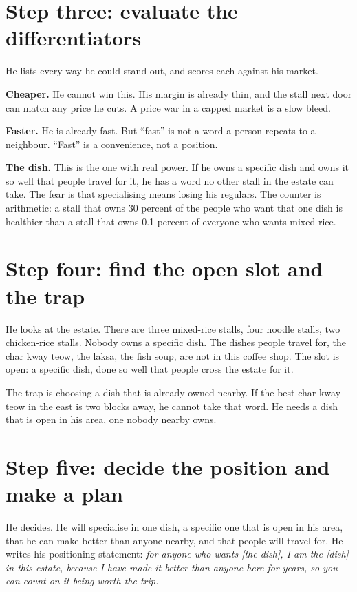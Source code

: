 \documentclass[10pt,twoside,openany]{memoir}
\newcommand{\needspacehead}{\needspace{4\baselineskip}}
\let\oldsection\section
\renewcommand{\section}{\needspacehead\oldsection}
\begin{document}
{\section{Step three: evaluate the
differentiators}\label{step-three-evaluate-the-differentiators}

He lists every way he could stand out, and scores each against his
market.

\textbf{Cheaper.} He cannot win this. His margin is already thin, and
the stall next door can match any price he cuts. A price war in a capped
market is a slow bleed.

\textbf{Faster.} He is already fast. But ``fast'' is not a word a person
repeats to a neighbour. ``Fast'' is a convenience, not a position.

\textbf{The dish.} This is the one with real power. If he owns a
specific dish and owns it so well that people travel for it, he has a
word no other stall in the estate can take. The fear is that
specialising means losing his regulars. The counter is arithmetic: a
stall that owns 30 percent of the people who want that one dish is
healthier than a stall that owns 0.1 percent of everyone who wants mixed
rice.

\section{Step four: find the open slot and the
trap}\label{step-four-find-the-open-slot-and-the-trap}

He looks at the estate. There are three mixed-rice stalls, four noodle
stalls, two chicken-rice stalls. Nobody owns a specific dish. The dishes
people travel for, the char kway teow, the laksa, the fish soup, are not
in this coffee shop. The slot is open: a specific dish, done so well
that people cross the estate for it.

The trap is choosing a dish that is already owned nearby. If the best
char kway teow in the east is two blocks away, he cannot take that word.
He needs a dish that is open in his area, one nobody nearby owns.

\section{Step five: decide the position and make a
plan}\label{step-five-decide-the-position-and-make-a-plan-1}

He decides. He will specialise in one dish, a specific one that is open
in his area, that he can make better than anyone nearby, and that people
will travel for. He writes his positioning statement: \emph{for anyone
who wants {[}the dish{]}, I am the {[}dish{]} in this estate, because I
have made it better than anyone here for years, so you can count on it
being worth the trip.}

}
\end{document}
